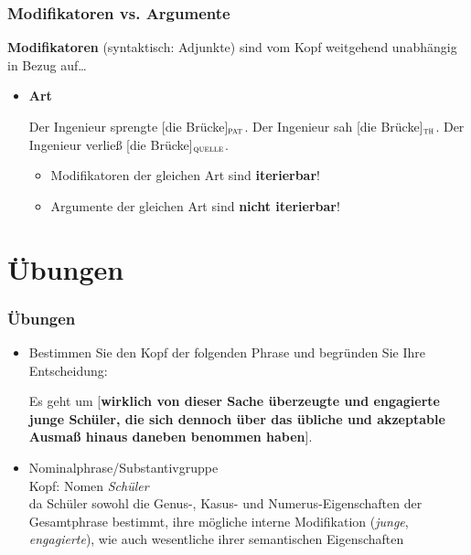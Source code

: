 \begin{frame}
\frametitle{Modifikatoren vs. Argumente}

\textbf{Modifikatoren} (syntaktisch: Adjunkte) sind vom Kopf weitgehend unabhängig in Bezug auf\dots

\begin{itemize}
	\item \textbf{Art}

\eal 
\ex Der Ingenieur sprengte \alert{[die Brücke]$_{\textsc{pat}}$}. 
\ex Der Ingenieur sah \alert{[die Brücke]$_{\textsc{th}}$}. 
\ex Der Ingenieur verließ \alert{[die Brücke]$_{\textsc{quelle}}$}.
\zl

	\begin{itemize}
		\item Modifikatoren der gleichen Art sind \textbf{iterierbar}!
		\item Argumente der gleichen Art sind \textbf{nicht iterierbar}!
		
		\eal 
		\zl

		
	\end{itemize}

\end{itemize}

\end{frame}


\section{Übungen}

\begin{frame}
\frametitle{Übungen}

\begin{itemize}

	\item Bestimmen Sie den Kopf der folgenden Phrase und begründen Sie Ihre Entscheidung:
	
		\ea Es geht um [\textbf{wirklich von dieser Sache überzeugte und engagierte junge Schüler, die sich dennoch über das übliche und akzeptable Ausmaß hinaus daneben benommen haben}].
		\z
	

	\pause
	\item[\ra] Nominalphrase/Substantivgruppe\\
	Kopf: Nomen \emph{Schüler}\\
	da Schüler sowohl die Genus-, Kasus- und Numerus-Eigenschaften der Gesamtphrase bestimmt, ihre mögliche interne Modifikation (\zB \emph{junge}, \emph{engagierte}), wie auch wesentliche ihrer semantischen Eigenschaften 
	
\end{itemize}

\end{frame}


